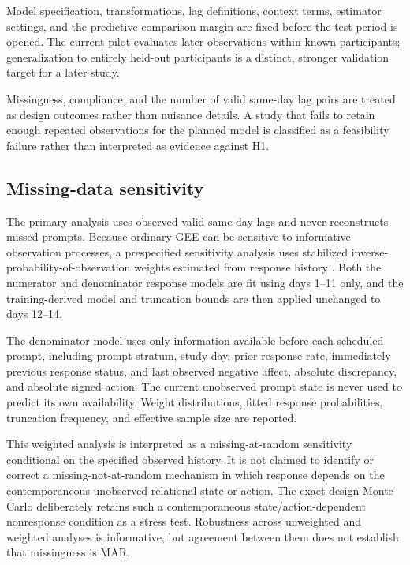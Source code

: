 Model specification, transformations, lag definitions, context terms, estimator settings, and the predictive comparison margin are fixed before the test period is opened. The current pilot evaluates later observations within known participants; generalization to entirely held-out participants is a distinct, stronger validation target for a later study.

Missingness, compliance, and the number of valid same-day lag pairs are treated as design outcomes rather than nuisance details. A study that fails to retain enough repeated observations for the planned model is classified as a feasibility failure rather than interpreted as evidence against H1.

\subsection{Missing-data sensitivity}

The primary analysis uses observed valid same-day lags and never reconstructs missed prompts. Because ordinary GEE can be sensitive to informative observation processes, a prespecified sensitivity analysis uses stabilized inverse-probability-of-observation weights estimated from response history \parencite{chen2010wgee,cole2008ipw}. Both the numerator and denominator response models are fit using days 1--11 only, and the training-derived model and truncation bounds are then applied unchanged to days 12--14.

The denominator model uses only information available before each scheduled prompt, including prompt stratum, study day, prior response rate, immediately previous response status, and last observed negative affect, absolute discrepancy, and absolute signed action. The current unobserved prompt state is never used to predict its own availability. Weight distributions, fitted response probabilities, truncation frequency, and effective sample size are reported.

This weighted analysis is interpreted as a missing-at-random sensitivity conditional on the specified observed history. It is not claimed to identify or correct a missing-not-at-random mechanism in which response depends on the contemporaneous unobserved relational state or action. The exact-design Monte Carlo deliberately retains such a contemporaneous state/action-dependent nonresponse condition as a stress test. Robustness across unweighted and weighted analyses is informative, but agreement between them does not establish that missingness is MAR.

